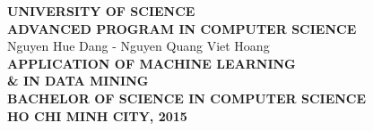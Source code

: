 
\begin{titlepage} 
{}
%

\begin{center}
{\selectfont
\textbf{\large UNIVERSITY OF SCIENCE \\[0.25cm]
ADVANCED PROGRAM IN COMPUTER SCIENCE}\\[1cm]

\textsf{\large Nguyen Hue Dang - Nguyen Quang Viet Hoang
}\\[3cm]

\textbf{\color[rgb]{0.255, 0.412, 0.882} \Large 
APPLICATION OF MACHINE LEARNING \\[0.25cm] \& IN DATA MINING
}
}\\[2cm]
\textbf{ \large
BACHELOR OF SCIENCE IN COMPUTER SCIENCE\\[8.5cm]
}
\textbf{ \normalsize
HO CHI MINH CITY, 2015
}
\end{center}

\end{titlepage}
